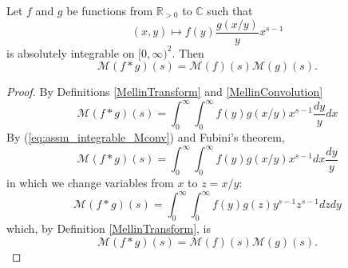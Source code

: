 \begin{theorem}[MellinConvolutionTransform]
\label{MellinConvolutionTransform}
\leanok
Let $f$ and $g$ be functions from $\mathbb{R}_{>0}$ to $\mathbb{C}$ such that
  \begin{equation}
    (x,y)\mapsto f(y)\frac{g(x/y)}yx^{s-1}
    \label{eq:assm_integrable_Mconv}
  \end{equation}
  is absolutely integrable on $[0,\infty)^2$.
  Then
  $$\mathcal{M}(f\ast g)(s) = \mathcal{M}(f)(s)\mathcal{M}(g)(s).$$
\end{theorem}
\begin{proof}
\leanok
By Definitions \ref{MellinTransform} and \ref{MellinConvolution}
  $$
    \mathcal M(f\ast g)(s)=
    \int_0^\infty \int_0^\infty f(y)g(x/y)x^{s-1}\frac{dy}ydx
  $$
  By (\ref{eq:assm_integrable_Mconv}) and Fubini's theorem,
  $$
    \mathcal M(f\ast g)(s)=
    \int_0^\infty \int_0^\infty f(y)g(x/y)x^{s-1}dx\frac{dy}y
  $$
  in which we change variables from $x$ to $z=x/y$:
  $$
    \mathcal M(f\ast g)(s)=
    \int_0^\infty \int_0^\infty f(y)g(z)y^{s-1}z^{s-1}dzdy
  $$
  which, by Definition \ref{MellinTransform}, is
  $$
    \mathcal M(f\ast g)(s)=
    \mathcal M(f)(s)\mathcal M(g)(s)
    .
  $$
\end{proof}

